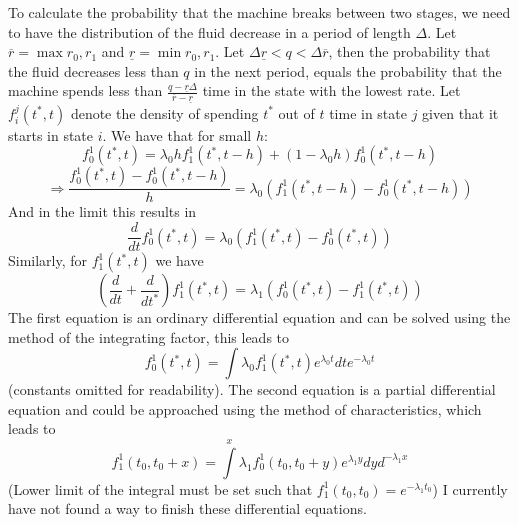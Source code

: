To calculate the probability that the machine breaks between two stages, we need to have the distribution of the fluid decrease in a period of length $\Delta$. Let $\overline{r}=\max{r_0,r_1}$ and $\underline{r}=\min{r_0,r_1}$. Let $\Delta\underline{r}<q<\Delta\overline{r}$, then the probability that the fluid decreases less than $q$ in the next period, equals the probability that the machine spends less than $\frac{q-\underline{r}\Delta}{\overline{r}-\underline{r}}$ time in the state with the lowest rate.
Let $f_{i}^j(t^*,t)$ denote the density of spending $t^*$ out of $t$ time in state $j$ given that it starts in state $i$. We have that for small $h$:
$$
f_{0}^1(t^*,t)=\lambda_0hf_1^1(t^*,t-h)+(1-\lambda_0h)f_{0}^1(t^*,t-h)
$$
$$
\Rightarrow \frac{f_{0}^1(t^*,t)-f_{0}^1(t^*,t-h)}{h}=\lambda_0(f_1^1(t^*,t-h)-f_{0}^1(t^*,t-h))
$$
And in the limit this results in
$$
\frac{d}{dt}f_{0}^1(t^*,t)=\lambda_0(f_1^1(t^*,t)-f_{0}^1(t^*,t))
$$
Similarly, for $f_1^1(t^*,t)$ we have
$$
(\frac{d}{dt}+\frac{d}{dt^*})f_1^1(t^*,t)=\lambda_1(f_0^1(t^*,t)-f_1^1(t^*,t))
$$
The first equation is an ordinary differential equation and can be solved using the method of the integrating factor, this leads to
$$
f_0^1(t^*,t)=\int\lambda_0f_1^1(t^*,t)e^{\lambda_0t}dte^{-\lambda_0t}
$$
(constants omitted for readability). The second equation is a partial differential equation and could be approached using the method of characteristics, which leads to
$$
f_1^1(t_0,t_0+x)=\int\limits^{x}\lambda_1f_0^1(t_0,t_0+y)e^{\lambda_1y}dyd^{-\lambda_1x}
$$
(Lower limit of the integral must be set such that $f_1^1(t_0,t_0)=e^{-\lambda_1t_0}$)
I currently have not found a way to finish these differential equations.